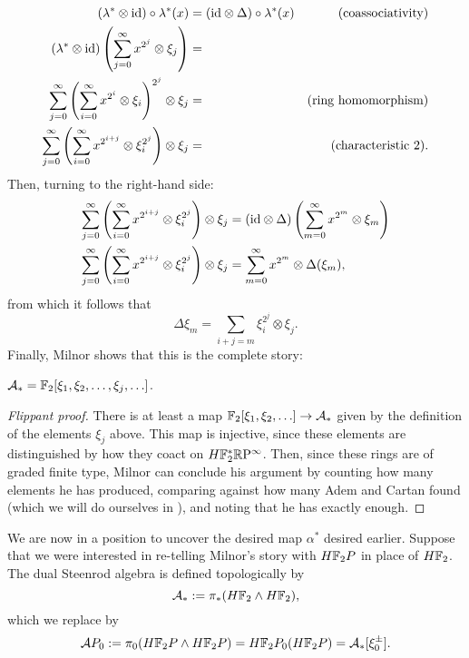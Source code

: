 \begin{align*}
(\lambda^* \otimes \mathrm{id}) \circ \lambda^*(x) & = (\mathrm{id} \otimes \Delta) \circ \lambda^*(x) & \text{(coassociativity)} \\
(\lambda^* \otimes \mathrm{id}) \left( \sum_{j=0}^\infty x^{2^j} \otimes \xi_j \right) & = \\
\sum_{j=0}^\infty \left( \sum_{i=0}^\infty x^{2^i} \otimes \xi_i \right)^{2^j} \otimes \xi_j & = & \text{(ring homomorphism)} \\
\sum_{j=0}^\infty \left( \sum_{i=0}^\infty x^{2^{i+j}} \otimes \xi_i^{2^j} \right) \otimes \xi_j & = & \text{(characteristic $2$)}.
\end{align*}
Then, turning to the right-hand side:
\begin{align*}
\sum_{j=0}^\infty \left( \sum_{i=0}^\infty x^{2^{i+j}} \otimes \xi_i^{2^j} \right) \otimes \xi_j & = (\mathrm{id} \otimes \Delta) \left( \sum_{m=0}^\infty x^{2^m} \otimes \xi_m \right) \\
\sum_{j=0}^\infty \left( \sum_{i=0}^\infty x^{2^{i+j}} \otimes \xi_i^{2^j} \right) \otimes \xi_j & = \sum_{m=0}^\infty x^{2^m} \otimes \Delta(\xi_m),
\end{align*}
from which it follows that \[\Delta \xi_m = \sum_{i+j=m} \xi_i^{2^j} \otimes \xi_j.\]  Finally, Milnor shows that this is the complete story:
\begin{theorem}[Milnor]
$\mathcal A_* = \mathbb F_2[\xi_1, \xi_2, \ldots, \xi_j, \ldots]$.
\end{theorem}
\begin{proof}[Flippant proof]
There is at least a map $\mathbb F_2[\xi_1, \xi_2, \ldots] \to \mathcal A_*$ given by the definition of the elements $\xi_j$ above.  This map is injective, since these elements are distinguished by how they coact on $H\mathbb F_2^* \mathbb R\mathrm P^\infty$.  Then, since these rings are of graded finite type, Milnor can conclude his argument by counting how many elements he has produced, comparing against how many Adem and Cartan found (which we will do ourselves in ), and noting that he has exactly enough.
\end{proof}

We are now in a position to uncover the desired map $\alpha^*$ desired earlier.  Suppose that we were interested in re-telling Milnor's story with $H\mathbb F_2P$ in place of $H\mathbb F_2$.  The dual Steenrod algebra is defined topologically by \[\mathcal A_* := \pi_*(H\mathbb F_2 \wedge H\mathbb F_2),\] which we replace by \[\mathcal AP_0 := \pi_0 (H\mathbb F_2 P \wedge H\mathbb F_2 P) = H\mathbb F_2P_0(H\mathbb F_2 P) = \mathcal A_*[\xi_0^\pm].\]

